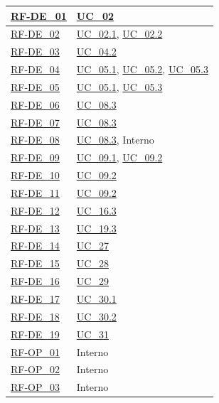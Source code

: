 \begin{longtable}{|>{\raggedright}p{}|>{\raggedright\arraybackslash}p{}|}
    \hyperlink{rf-de_1}{RF-DE\_01} & \hyperref[uc_02]{UC\_02} \\ \hline
    \hyperlink{rf-de_2}{RF-DE\_02} & \hyperref[uc_02.1]{UC\_02.1}, \hyperref[uc_02.2]{UC\_02.2} \\ \hline
    \hyperlink{rf-de_3}{RF-DE\_03} & \hyperref[uc_04.2]{UC\_04.2} \\ \hline
    \hyperlink{rf-de_4}{RF-DE\_04} & \hyperref[uc_05.1]{UC\_05.1}, \hyperref[uc_05.2]{UC\_05.2}, \hyperref[uc_05.3]{UC\_05.3} \\ \hline
    \hyperlink{rf-de_5}{RF-DE\_05} & \hyperref[uc_05.1]{UC\_05.1}, \hyperref[uc_05.3]{UC\_05.3} \\ \hline
    \hyperlink{rf-de_6}{RF-DE\_06} & \hyperref[uc_08.3]{UC\_08.3} \\ \hline
    \hyperlink{rf-de_7}{RF-DE\_07} & \hyperref[uc_08.3]{UC\_08.3} \\ \hline
    \hyperlink{rf-de_8}{RF-DE\_08} & \hyperref[uc_08.3]{UC\_08.3}, Interno \\ \hline
    \hyperlink{rf-de_9}{RF-DE\_09} & \hyperref[uc_09.1]{UC\_09.1}, \hyperref[uc_09.2]{UC\_09.2} \\ \hline
    \hyperlink{rf-de_10}{RF-DE\_10} & \hyperref[uc_09.2]{UC\_09.2} \\ \hline
    \hyperlink{rf-de_11}{RF-DE\_11} & \hyperref[uc_09.2]{UC\_09.2} \\ \hline
    \hyperlink{rf-de_12}{RF-DE\_12} & \hyperref[uc_16.3]{UC\_16.3} \\ \hline
    \hyperlink{rf-de_13}{RF-DE\_13} & \hyperref[uc_19.3]{UC\_19.3} \\ \hline
    \hyperlink{rf-de_14}{RF-DE\_14} & \hyperref[uc_27]{UC\_27} \\ \hline
    \hyperlink{rf-de_15}{RF-DE\_15} & \hyperref[uc_28]{UC\_28} \\ \hline
    \hyperlink{rf-de_16}{RF-DE\_16} & \hyperref[uc_29]{UC\_29} \\ \hline
    \hyperlink{rf-de_17}{RF-DE\_17} & \hyperref[uc_30.1]{UC\_30.1} \\ \hline
    \hyperlink{rf-de_18}{RF-DE\_18} & \hyperref[uc_30.2]{UC\_30.2} \\ \hline
    \hyperlink{rf-de_19}{RF-DE\_19} & \hyperref[uc_31]{UC\_31} \\ \hline
    
    \hyperlink{rf-op_1}{RF-OP\_01} & Interno \\ \hline
    \hyperlink{rf-op_2}{RF-OP\_02} & Interno \\ \hline
    \hyperlink{rf-op_3}{RF-OP\_03} & Interno \\ \hline


\end{longtable}
